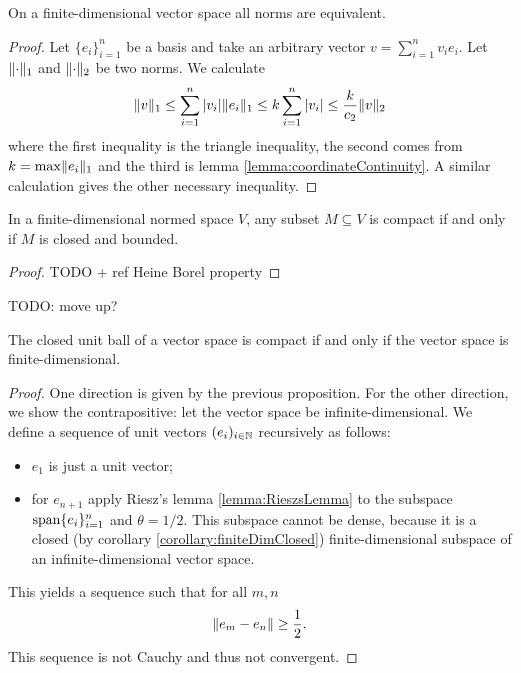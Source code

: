 \begin{proposition}
On a finite-dimensional vector space all norms are equivalent.
\end{proposition}
\begin{proof}
Let $\{e_i\}_{i=1}^n$ be a basis and take an arbitrary vector $v = \sum_{i=1}^nv_ie_i$. Let $\lVert\cdot\rVert_1$ and $\lVert\cdot\rVert_2$ be two norms.
We calculate
\[ \lVert v\rVert_1 \leq \sum_{i=1}^n|v_i|\lVert e_i\rVert_1 \leq k\sum_{i=1}^n|v_i| \leq \frac{k}{c_2}\lVert v\rVert_2 \]
where the first inequality is the triangle inequality, the second comes from $k=\max\lVert e_i\rVert_1$ and the third is lemma \ref{lemma:coordinateContinuity}. A similar calculation gives the other necessary inequality.
\end{proof}

\begin{proposition}
In a finite-dimensional normed space $V$, any subset $M \subseteq V$ is compact if and only if $M$ is closed and bounded.
\end{proposition}
\begin{proof}
TODO + ref Heine Borel property
\end{proof}


TODO: move up?
\begin{proposition} \label{prop:compactnessUnitBall}
The closed unit ball of a vector space is compact \textup{if and only if} the vector space is finite-dimensional.
\end{proposition}
\begin{proof}
One direction is given by the previous proposition. For the other direction, we show the contrapositive: let the vector space be infinite-dimensional.
We define a sequence of unit vectors $(e_i)_{i\in\mathbb{N}}$ recursively as follows:
\begin{itemize}
\item $e_1$ is just a unit vector;
\item for $e_{n+1}$ apply Riesz's lemma \ref{lemma:RieszsLemma} to the subspace $\operatorname{span}\{e_i\}_{i=1}^n$ and $\theta = 1/2$. This subspace cannot be dense, because it is a closed (by corollary \ref{corollary:finiteDimClosed}) finite-dimensional subspace of an infinite-dimensional vector space.
\end{itemize}
This yields a sequence such that for all $m,n$
\[ \lVert e_m - e_n\rVert\geq \frac{1}{2}. \]
This sequence is not Cauchy and thus not convergent.
\end{proof}







